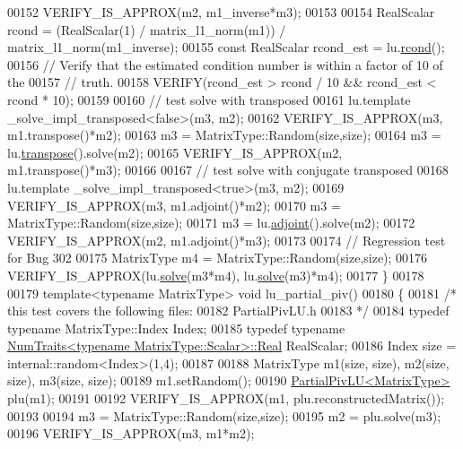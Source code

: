 \begin{DoxyCode}
00152   VERIFY\_IS\_APPROX(m2, m1\_inverse*m3);
00153 
00154   RealScalar rcond = (RealScalar(1) / matrix\_l1\_norm(m1)) / matrix\_l1\_norm(m1\_inverse);
00155   \textcolor{keyword}{const} RealScalar rcond\_est = lu.\hyperlink{group___l_u___module_a0bc63f910960dc3e35acecc8442025b6}{rcond}();
00156   \textcolor{comment}{// Verify that the estimated condition number is within a factor of 10 of the}
00157   \textcolor{comment}{// truth.}
00158   VERIFY(rcond\_est > rcond / 10 && rcond\_est < rcond * 10);
00159 
00160   \textcolor{comment}{// test solve with transposed}
00161   lu.template \_solve\_impl\_transposed<false>(m3, m2);
00162   VERIFY\_IS\_APPROX(m3, m1.transpose()*m2);
00163   m3 = MatrixType::Random(size,size);
00164   m3 = lu.\hyperlink{class_eigen_1_1_solver_base_a732e75b5132bb4db3775916927b0e86c}{transpose}().solve(m2);
00165   VERIFY\_IS\_APPROX(m2, m1.transpose()*m3);
00166 
00167   \textcolor{comment}{// test solve with conjugate transposed}
00168   lu.template \_solve\_impl\_transposed<true>(m3, m2);
00169   VERIFY\_IS\_APPROX(m3, m1.adjoint()*m2);
00170   m3 = MatrixType::Random(size,size);
00171   m3 = lu.\hyperlink{class_eigen_1_1_solver_base_a05a3686a89888681c8e0c2bcab6d1ce5}{adjoint}().solve(m2);
00172   VERIFY\_IS\_APPROX(m2, m1.adjoint()*m3);
00173 
00174   \textcolor{comment}{// Regression test for Bug 302}
00175   MatrixType m4 = MatrixType::Random(size,size);
00176   VERIFY\_IS\_APPROX(lu.\hyperlink{group___l_u___module_af563471f6f3283fd10779ef02dd0b748}{solve}(m3*m4), lu.\hyperlink{group___l_u___module_af563471f6f3283fd10779ef02dd0b748}{solve}(m3)*m4);
00177 \}
00178 
00179 \textcolor{keyword}{template}<\textcolor{keyword}{typename} MatrixType> \textcolor{keywordtype}{void} lu\_partial\_piv()
00180 \{
00181   \textcolor{comment}{/* this test covers the following files:}
00182 \textcolor{comment}{     PartialPivLU.h}
00183 \textcolor{comment}{  */}
00184   \textcolor{keyword}{typedef} \textcolor{keyword}{typename} MatrixType::Index Index;
00185   \textcolor{keyword}{typedef} \textcolor{keyword}{typename} \hyperlink{group___core___module_struct_eigen_1_1_num_traits}{NumTraits<typename MatrixType::Scalar>::Real}
       RealScalar;
00186   Index size = internal::random<Index>(1,4);
00187 
00188   MatrixType m1(size, size), m2(size, size), m3(size, size);
00189   m1.setRandom();
00190   \hyperlink{group___l_u___module_class_eigen_1_1_partial_piv_l_u}{PartialPivLU<MatrixType>} plu(m1);
00191 
00192   VERIFY\_IS\_APPROX(m1, plu.reconstructedMatrix());
00193 
00194   m3 = MatrixType::Random(size,size);
00195   m2 = plu.solve(m3);
00196   VERIFY\_IS\_APPROX(m3, m1*m2);

\end{DoxyCode}
